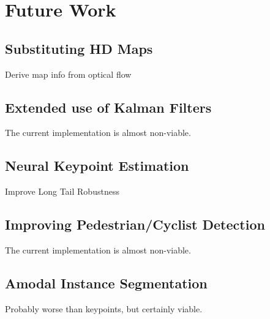 
\chapter{Future Work}
\label{ch:future}

\section{Substituting HD Maps}
\label{sec:nomap}

Derive map info from optical flow

\section{Extended use of Kalman Filters}
\label{sec:extkalman}

The current implementation is almost non-viable.

\section{Neural Keypoint Estimation}
\label{sec:neuralkeypoints}

Improve Long Tail Robustness

\section{Improving Pedestrian/Cyclist Detection}
\label{sec:improvepedcyclist}

The current implementation is almost non-viable.

\section{Amodal Instance Segmentation}
\label{sec:amodal}

Probably worse than keypoints, but certainly viable.
